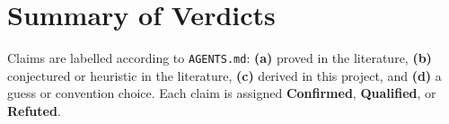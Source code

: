 \documentclass[11pt,a4paper]{article}
\begin{document}
\begin{abstract}
\begin{enumerate}[leftmargin=2em]
  \item \textbf{Head-on directional coefficient and error budgets (Points~2 \&~10):} We \textbf{confirm} \textbf{(c)} that the defined two-term head-on observable $R_{12}^{\mathrm{ho}}(y_1,y_2;h)$ vanishes at $O(h^0)$, but \textbf{qualify} \textbf{(d)} its physical interpretation because the algebraically antisymmetric endpoint representative $\mathcal{B}_{\mathrm{ho}}/h\to (B(u_1)-\sqrt{\pi})(B(u_2)-\sqrt{\pi})$ does not vanish after subtracting $4rY$. We also \textbf{qualify} the error budgets at large $Y$ in the $h$-fit ($\kappa_1=1.453>1$ at $Y=64, h=0.02$) and at small $r=0.25$ in the $1/Y$-fit ($y_2=r^2Y=2$ at $Y=32$, causing a $2684\times$ truncation-error jump in $S^{(1)}(0.25)$ that can be eliminated by using the exact one-body symmetric limit).
\end{enumerate}
\end{abstract}

\tableofcontents

\section{Summary of Verdicts}

Claims are labelled according to \texttt{AGENTS.md}: \textbf{(a)} proved in the literature, \textbf{(b)} conjectured or heuristic in the literature, \textbf{(c)} derived in this project, and \textbf{(d)} a guess or convention choice. Each claim is assigned \textbf{Confirmed}, \textbf{Qualified}, or \textbf{Refuted}.
\end{document}
